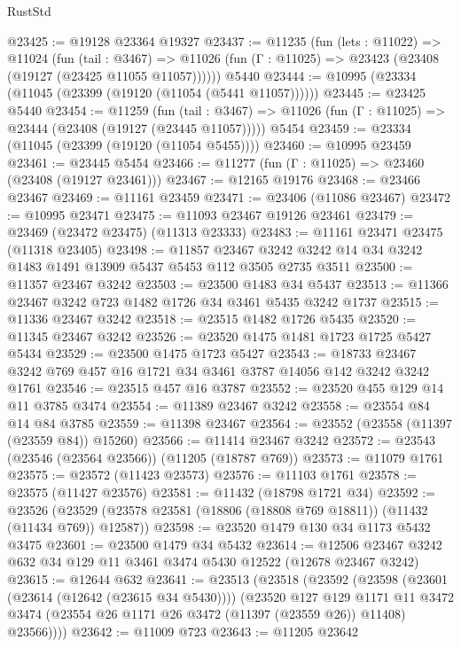 \begin{lexlean}{RustStd}
\begin{coremodule}
@23425 := @19128 @23364 @19327
@23437 := @11235
    (fun (lets : @11022) =>
    @11024
      (fun (tail : @3467) =>
      @11026 (fun (Γ : @11025) => @23423 (@23408 (@19127 (@23425 @11055 @11057))))))
    @5440
@23444 := @10995 (@23334 (@11045 (@23399 (@19120 (@11054 (@5441 @11057))))))
@23445 := @23425 @5440
@23454 := @11259
    (fun (tail : @3467) => @11026 (fun (Γ : @11025) => @23444 (@23408 (@19127 (@23445 @11057)))))
    @5454
@23459 := @23334 (@11045 (@23399 (@19120 (@11054 @5455))))
@23460 := @10995 @23459
@23461 := @23445 @5454
@23466 := @11277 (fun (Γ : @11025) => @23460 (@23408 (@19127 @23461)))
@23467 := @12165 @19176
@23468 := @23466 @23467
@23469 := @11161 @23459
@23471 := @23406 (@11086 @23467)
@23472 := @10995 @23471
@23475 := @11093 @23467 @19126 @23461
@23479 := @23469 (@23472 @23475) (@11313 @23333)
@23483 := @11161 @23471 @23475 (@11318 @23405)
@23498 := @11857
    @23467
    @3242
    @3242
    @14
    @34
    @3242
    @1483
    @1491
    @13909
    @5437
    @5453
    @112
    @3505
    @2735
    @3511
@23500 := @11357 @23467 @3242
@23503 := @23500 @1483 @34 @5437
@23513 := @11366 @23467 @3242 @723 @1482 @1726 @34 @3461 @5435 @3242 @1737
@23515 := @11336 @23467 @3242
@23518 := @23515 @1482 @1726 @5435
@23520 := @11345 @23467 @3242
@23526 := @23520 @1475 @1481 @1723 @1725 @5427 @5434
@23529 := @23500 @1475 @1723 @5427
@23543 := @18733 @23467 @3242 @769 @457 @16 @1721 @34 @3461 @3787 @14056 @142 @3242 @3242 @1761
@23546 := @23515 @457 @16 @3787
@23552 := @23520 @455 @129 @14 @11 @3785 @3474
@23554 := @11389 @23467 @3242
@23558 := @23554 @84 @14 @84 @3785
@23559 := @11398 @23467
@23564 := @23552 (@23558 (@11397 (@23559 @84)) @15260)
@23566 := @11414 @23467 @3242
@23572 := @23543 (@23546 (@23564 @23566)) (@11205 (@18787 @769))
@23573 := @11079 @1761
@23575 := @23572 (@11423 @23573)
@23576 := @11103 @1761
@23578 := @23575 (@11427 @23576)
@23581 := @11432 (@18798 @1721 @34)
@23592 := @23526
    (@23529 (@23578 @23581 (@18806 (@18808 @769 @18811)) (@11432 (@11434 @769)) @12587))
@23598 := @23520 @1479 @130 @34 @1173 @5432 @3475
@23601 := @23500 @1479 @34 @5432
@23614 := @12506 @23467 @3242 @632 @34 @129 @11 @3461 @3474 @5430 @12522 (@12678 @23467 @3242)
@23615 := @12644 @632
@23641 := @23513
    (@23518
      (@23592
        (@23598
          (@23601 (@23614 (@12642 (@23615 @34 @5430))))
          (@23520
            @127
            @129
            @1171
            @11
            @3472
            @3474
            (@23554 @26 @1171 @26 @3472 (@11397 (@23559 @26)) @11408)
            @23566))))
@23642 := @11009 @723
@23643 := @11205 @23642

\end{coremodule}
\end{lexlean}
